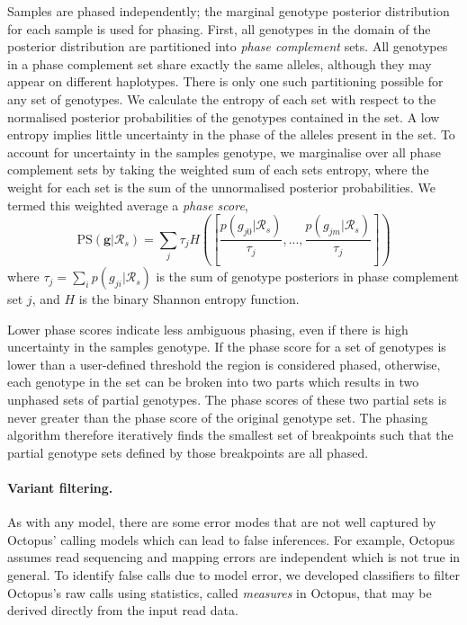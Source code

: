 \documentclass[notitlepage, twocolumn, 10pt]{article}
\begin{document}
Samples are phased independently; the marginal genotype posterior distribution for each sample is used for phasing. First, all genotypes in the domain of the posterior distribution are partitioned into \emph{phase complement} sets. All genotypes in a phase complement set share exactly the same alleles, although they may appear on different haplotypes. There is only one such partitioning possible for any set of genotypes. We calculate the entropy of each set with respect to the normalised posterior probabilities of the genotypes contained in the set. A low entropy implies little uncertainty in the phase of the alleles present in the set. To account for uncertainty in the samples genotype, we marginalise over all phase complement sets by taking the weighted sum of each sets entropy, where the weight for each set is the sum of the unnormalised posterior probabilities. We termed this weighted average a \emph{phase score},
\begin{equation*}
    \text{PS}(\boldsymbol{g} | \mathcal{R}_s) = \sum_j \tau_j H\left(\left[\frac{p(g_{j0} | \mathcal{R}_s)}{\tau_j}, ..., \frac{p(g_{jm}| \mathcal{R}_s)}{\tau_j}\right]\right)
\end{equation*}
where $\tau_j = \sum_i p(g_{ji}| \mathcal{R}_s)$ is the sum of genotype posteriors in phase complement set $j$, and $H$ is the binary Shannon entropy function.

Lower phase scores indicate less ambiguous phasing, even if there is high uncertainty in the samples genotype. If the phase score for a set of genotypes is lower than a user-defined threshold the region is considered phased, otherwise, each genotype in the set can be broken into two parts which results in two unphased sets of partial genotypes. The phase scores of these two partial sets is never greater than the phase score of the original genotype set. The phasing algorithm therefore iteratively finds the smallest set of breakpoints such that the partial genotype sets defined by those breakpoints are all phased.

\paragraph*{Variant filtering.} As with any model, there are some error modes that are not well captured by Octopus’ calling models which can lead to false inferences. For example, Octopus assumes read sequencing and mapping errors are independent which is not true in general. To identify false calls due to model error, we developed classifiers to filter Octopus’s raw calls using statistics, called \emph{measures} in Octopus, that may be derived directly from the input read data.
\end{document}
